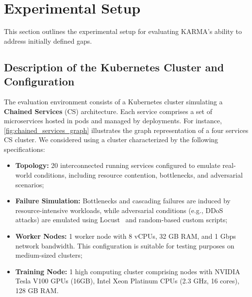\documentclass[conference]{IEEEtran}
\begin{document}
\section{Experimental Setup}
\label{sec:experiments}

This section outlines the experimental setup for evaluating KARMA's ability to address initially defined gaps.

\subsection{Description of the Kubernetes Cluster and Configuration}

The evaluation environment consists of a Kubernetes cluster simulating a \textbf{Chained Services} (CS) architecture. Each service comprises a set of microservices hosted in pods and managed by deployments. For instance, \autoref{fig:chained_services_graph} illustrates the graph representation of a four services CS cluster. We considered using a cluster characterized by the following specifications:

\begin{itemize}
    \item \textbf{Topology:} 20 interconnected running services configured to emulate real-world conditions, including resource contention, bottlenecks, and adversarial scenarios;
    \item \textbf{Failure Simulation:} Bottlenecks and cascading failures are induced by resource-intensive workloads, while adversarial conditions (e.g., DDoS attacks) are emulated using Locust~\cite{locust2021} and random-based custom scripts;
    \item \textbf{Worker Nodes:} 1 worker node with 8 vCPUs, 32 GB RAM, and 1 Gbps network bandwidth. This configuration is suitable for testing purposes on medium-sized clusters;
    \item \textbf{Training Node:} 1 high computing cluster comprising nodes with NVIDIA Tesla V100 GPUs (16GB), Intel Xeon Platinum CPUs (2.3 GHz, 16 cores), 128 GB RAM.
\end{itemize}
\end{document}
